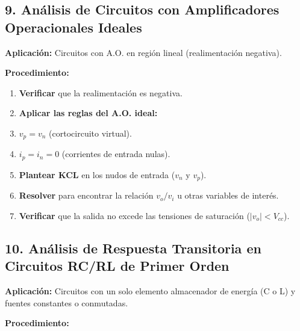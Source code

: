 \documentclass[11pt,a4paper]{article}
\begin{document}
\subsection*{9. Análisis de Circuitos con Amplificadores Operacionales Ideales}


\textbf{Aplicación:} Circuitos con A.O. en región lineal (realimentación negativa).


\textbf{Procedimiento:}


\begin{enumerate}[leftmargin=*,topsep=2pt,itemsep=1pt]
  \item \textbf{Verificar} que la realimentación es negativa.
  \item \textbf{Aplicar las reglas del A.O. ideal:}
  \item $v_p = v_n$ (cortocircuito virtual).
  \item $i_p = i_n = 0$ (corrientes de entrada nulas).
  \item \textbf{Plantear KCL} en los nudos de entrada ($v_n$ y $v_p$).
  \item \textbf{Resolver} para encontrar la relación $v_o / v_i$ u otras variables de interés.
  \item \textbf{Verificar} que la salida no excede las tensiones de saturación ($|v_o| < V_{cc}$).
\end{enumerate}


\subsection*{10. Análisis de Respuesta Transitoria en Circuitos RC/RL de Primer Orden}


\textbf{Aplicación:} Circuitos con un solo elemento almacenador de energía (C o L) y fuentes constantes o conmutadas.


\textbf{Procedimiento:}
\end{document}
